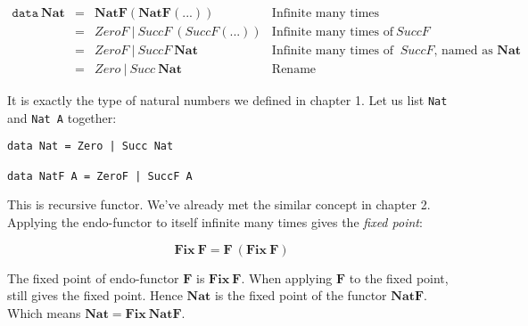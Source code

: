 \documentclass{article}
\begin{document}
\[
\begin{array}{rcll}
\texttt{data}\ \mathbf{Nat} & = & \mathbf{NatF}(\mathbf{NatF}(...)) & \text{Infinite many times} \\
         & = & ZeroF\ |\ SuccF\ (SuccF (...)) & \text{Infinite many times of}\ SuccF \\
         & = & ZeroF\ |\ SuccF\ \mathbf{Nat} & \text{Infinite many times of }\ SuccF \text{, named as }\mathbf{Nat} \\
         & = & Zero\ |\ Succ\ \mathbf{Nat} & \text{Rename}
\end{array}
\]

It is exactly the type of natural numbers we defined in chapter 1. Let us list \texttt{Nat} and \texttt{Nat A} together:

\begin{lstlisting}
data Nat = Zero | Succ Nat

data NatF A = ZeroF | SuccF A
\end{lstlisting}

This is recursive functor. We've already met the similar concept in chapter 2. Applying the endo-functor to itself infinite many times gives the {\em fixed point}:

\[
\mathbf{Fix}\ \mathbf{F} = \mathbf{F}\ (\mathbf{Fix}\ \mathbf{F})
\]

The fixed point of endo-functor $\mathbf{F}$ is $\mathbf{Fix}\ \mathbf{F}$. When applying $\mathbf{F}$ to the fixed point, still gives the fixed point. Hence $\mathbf{Nat}$ is the fixed point of the functor $\mathbf{NatF}$. Which means $\mathbf{Nat} = \mathbf{Fix}\ \mathbf{NatF}$.

\end{document}
